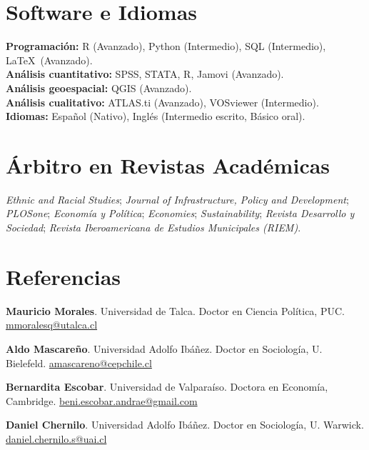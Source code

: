 \documentclass[11pt,a4paper]{article}
\begin{document}
\section{Software e Idiomas}

\textbf{Programación:} R (Avanzado), Python (Intermedio), SQL (Intermedio), \LaTeX\ (Avanzado).\\
\textbf{Análisis cuantitativo:} SPSS, STATA, R, Jamovi (Avanzado).\\
\textbf{Análisis geoespacial:} QGIS (Avanzado).\\
\textbf{Análisis cualitativo:} ATLAS.ti (Avanzado), VOSviewer (Intermedio).\\
\textbf{Idiomas:} Español (Nativo), Inglés (Intermedio escrito, Básico oral).

\section{Árbitro en Revistas Académicas}

\textit{Ethnic and Racial Studies}; \textit{Journal of Infrastructure, Policy and Development}; \textit{PLOSone}; \textit{Economía y Política}; \textit{Economies}; \textit{Sustainability}; \textit{Revista Desarrollo y Sociedad}; \textit{Revista Iberoamericana de Estudios Municipales (RIEM)}.

\section{Referencias}

\textbf{Mauricio Morales}. Universidad de Talca. Doctor en Ciencia Política, PUC. \href{mailto:mmoralesq@utalca.cl}{mmoralesq@utalca.cl}

\textbf{Aldo Mascareño}. Universidad Adolfo Ibáñez. Doctor en Sociología, U. Bielefeld. \href{mailto:amascareno@cepchile.cl}{amascareno@cepchile.cl}

\textbf{Bernardita Escobar}. Universidad de Valparaíso. Doctora en Economía, Cambridge. \href{mailto:beni.escobar.andrae@gmail.com}{beni.escobar.andrae@gmail.com}

\textbf{Daniel Chernilo}. Universidad Adolfo Ibáñez. Doctor en Sociología, U. Warwick. \href{mailto:daniel.chernilo.s@uai.cl}{daniel.chernilo.s@uai.cl}
\end{document}
